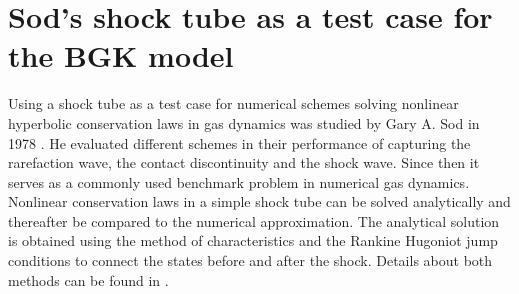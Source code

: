\section{Sod's shock tube as a test case for the BGK model} \label{Sec:FeaturesSOD}
Using a shock tube as a test case for numerical schemes solving nonlinear hyperbolic conservation laws in gas dynamics was studied by Gary A. Sod in 1978 \cite{Sod}. He evaluated different schemes in their performance of capturing the rarefaction wave, the contact discontinuity and the shock wave. Since then it serves as a commonly used benchmark problem in numerical gas dynamics.\\
Nonlinear conservation laws in a simple shock tube can be solved analytically and thereafter be compared to the numerical approximation. The analytical solution is obtained using the method of characteristics and the Rankine Hugoniot jump conditions to connect the states before and after the shock. Details about both methods can be found in \cite{CFD1}.\\

